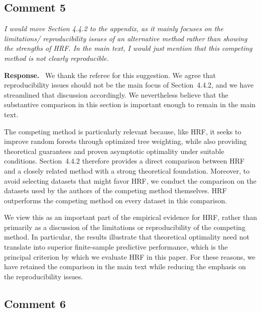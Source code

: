 \documentclass[12pt]{article}
\newcommand{\comment}[1]{\begin{refbox}\itshape #1\end{refbox}}
\newcommand{\response}{\medskip\noindent\textbf{Response.}\ }
\begin{document}
\newpage
\subsection*{Comment 5}

\comment{I would move Section 4.4.2 to the appendix, as it mainly focuses on
the limitations/ reproducibility issues of an alternative method rather than
showing the strengths of HRF. In the main text, I would just mention that
this competing method is not clearly reproducible.}

\response
We thank the referee for this suggestion. We agree that reproducibility issues should not be the main focus of Section~4.4.2, and we have streamlined that discussion accordingly. We nevertheless believe that the substantive comparison in this section is important enough to remain in the main text.

The competing method is particularly relevant because, like HRF, it seeks to improve random forests through optimized tree weighting, while also providing theoretical guarantees and proven asymptotic optimality under suitable conditions. Section~4.4.2 therefore provides a direct comparison between HRF and a closely related method with a strong theoretical foundation. Moreover, to avoid selecting datasets that might favor HRF, we conduct the comparison on the datasets used by the authors of the competing method themselves. HRF outperforms the competing method on every dataset in this comparison.

We view this as an important part of the empirical evidence for HRF, rather than primarily as a discussion of the limitations or reproducibility of the competing method. In particular, the results illustrate that theoretical optimality need not translate into superior finite-sample predictive performance, which is the principal criterion by which we evaluate HRF in this paper. For these reasons, we have retained the comparison in the main text while reducing the emphasis on the reproducibility issues.



\subsection*{Comment 6}
\end{document}
